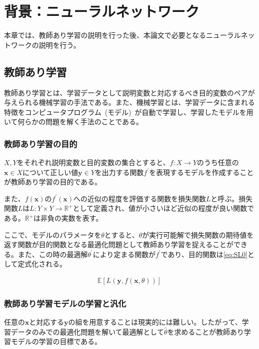 \chapter{背景：ニューラルネットワーク}

本章では、教師あり学習の説明を行った後、本論文で必要となるニューラルネットワークの説明を行う。

\section{教師あり学習}

教師あり学習とは、学習データとして説明変数と対応するべき目的変数のペアが与えられる機械学習の手法である。また、機械学習とは、学習データに含まれる特徴をコンピュータプログラム~(モデル)~が自動で学習し、学習したモデルを用いて何らかの問題を解く手法のことである。

\subsection{教師あり学習の目的}

$X,Y$をそれぞれ説明変数と目的変数の集合とすると、$f:X\rightarrow Y$のうち任意の$\boldsymbol{x} \in X$について正しい値$\boldsymbol{y} \in Y$を出力する関数$f^{'}$を表現するモデルを作成することが教師あり学習の目的である。

また、$f(\boldsymbol{x})$の$f^{'}(\boldsymbol{x})$への近似の程度を評価する関数を損失関数$L$と呼ぶ。損失関数$L$は$L:Y \times Y \rightarrow \mathbb{R}^+$として定義され、値が小さいほど近似の程度が良い関数である。$\mathbb{R}^+$は非負の実数を表す。

ここで、モデルのパラメータを$\theta$とすると、$\theta$が実行可能解で損失関数の期待値を返す関数が目的関数となる最適化問題として教師あり学習を捉えることができる。また、この時の最適解$\theta^{'}$により定まる関数が$f^{'}$であり、目的関数は\ref{eq:SL0}として定式化される。

\begin{align}
    \label{eq:SL0}
    \mathbb{E}[L(\boldsymbol{y},f(\boldsymbol{x},\theta))]
\end{align}

\subsection{教師あり学習モデルの学習と汎化}

任意の$\boldsymbol{x}$と対応する$\boldsymbol{y}$の組を用意することは現実的には難しい。したがって、学習データのみでの最適化問題を解いて最適解として$\hat{\theta}$を求めることが教師あり学習モデルの学習の目標である。

